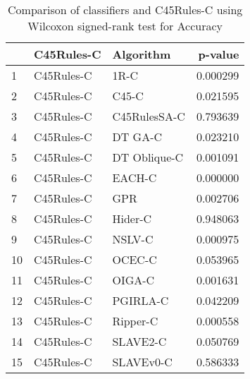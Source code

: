\begin{table}
\footnotesize
\caption{Comparison of classifiers and C45Rules-C using Wilcoxon signed-rank test for Accuracy}
\label{tab:C45Rules-C wilcoxon Accuracy comparison}
\begin{tabular}{lllr}
\hline
 & C45Rules-C & Algorithm & p-value \\
\hline
1 & C45Rules-C & 1R-C & 0.000299 \\
2 & C45Rules-C & C45-C & 0.021595 \\
3 & C45Rules-C & C45RulesSA-C & 0.793639 \\
4 & C45Rules-C & DT GA-C & 0.023210 \\
5 & C45Rules-C & DT Oblique-C & 0.001091 \\
6 & C45Rules-C & EACH-C & 0.000000 \\
7 & C45Rules-C & GPR & 0.002706 \\
8 & C45Rules-C & Hider-C & 0.948063 \\
9 & C45Rules-C & NSLV-C & 0.000975 \\
10 & C45Rules-C & OCEC-C & 0.053965 \\
11 & C45Rules-C & OIGA-C & 0.001631 \\
12 & C45Rules-C & PGIRLA-C & 0.042209 \\
13 & C45Rules-C & Ripper-C & 0.000558 \\
14 & C45Rules-C & SLAVE2-C & 0.050769 \\
15 & C45Rules-C & SLAVEv0-C & 0.586333 \\
\hline
\end{tabular}
\end{table}
